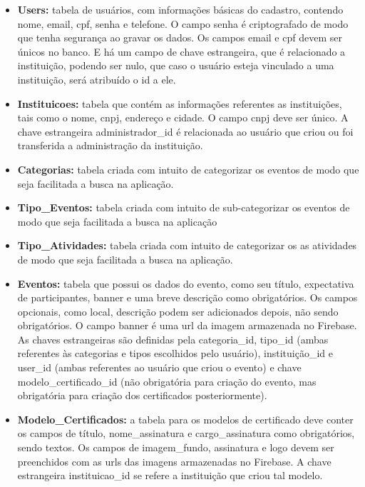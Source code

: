 \begin{itemize}
    \item \textbf{Users:} tabela de usuários, com informações básicas do cadastro, contendo nome, email, cpf, senha e telefone. O campo senha é criptografado de modo que tenha segurança ao gravar os dados. Os campos email e cpf devem ser únicos no banco. E há um campo de chave estrangeira, que é relacionado a instituição, podendo ser nulo, que caso o usuário esteja vinculado a uma instituição, será atribuído o id a ele.
    
    \item \textbf{Instituicoes:} tabela que contém as informações referentes as instituições, tais como o nome, cnpj, endereço e cidade. O campo cnpj deve ser único. A chave estrangeira administrador\_id é relacionada ao usuário que criou ou foi transferida a administração da instituição.
    
    \item \textbf{Categorias:} tabela criada com intuito de categorizar os eventos de modo que seja facilitada a busca na aplicação.
    
    \item \textbf{Tipo\_Eventos:} tabela criada com intuito de sub-categorizar os eventos de modo que seja facilitada a busca na aplicação
    
    \item \textbf{Tipo\_Atividades:} tabela criada com intuito de categorizar os as atividades de modo que seja facilitada a busca na aplicação.
    
    \item \textbf{Eventos:} tabela que possui os dados do evento, como seu título, expectativa de participantes, banner e uma breve descrição como obrigatórios. Os campos opcionais, como local, descrição podem ser adicionados depois, não sendo obrigatórios. O campo banner é uma url da imagem armazenada no Firebase. As chaves estrangeiras são definidas pela categoria\_id, tipo\_id (ambas referentes às categorias e tipos escolhidos pelo usuário), instituição\_id e user\_id (ambas referentes ao usuário que criou o evento) e chave modelo\_certificado\_id (não obrigatória para criação do evento, mas obrigatória para criação dos certificados posteriormente).
    
    \item \textbf{Modelo\_Certificados:} a tabela para os modelos de certificado deve conter os campos de título, nome\_assinatura e cargo\_assinatura como obrigatórios, sendo textos. Os campos de imagem\_fundo, assinatura e logo devem ser preenchidos com as urls das imagens armazenadas no Firebase. A chave estrangeira instituicao\_id se refere a instituição que criou tal modelo.
    

\end{itemize}
